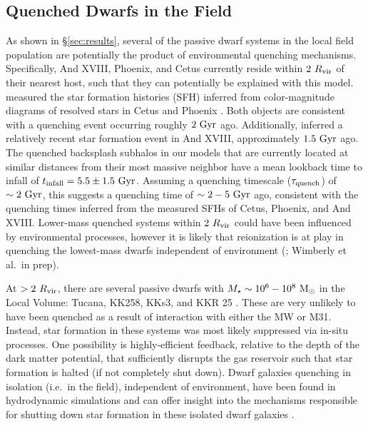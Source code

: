 \documentclass[usenatbib]{mnras}
\newcommand{\rvir}{R_{\rm vir}}
\newcommand{\mstar}{{M}_{\star}}
\newcommand{\msun}{{\rm M}_{\odot}}
\begin{document}
\subsection{Quenched Dwarfs in the Field}
\label{subsec:weirdos}


As shown in \S\ref{sec:results}, several of the passive dwarf systems in the
local field population are potentially the product of environmental quenching
mechanisms. 
Specifically, And XVIII, Phoenix, and Cetus currently reside within
$2~\rvir$ of their nearest host, such that they can potentially be
explained with this model. 
%
\citet{weisz14a} measured the star formation histories (SFH) inferred
from color-magnitude diagrams of resolved stars in Cetus and Phoenix
\citep[see also][]{hidalgo,monelli10a,monelli10b,monelli12}. 
Both objects are consistent with a quenching event occurring roughly
$2~{\rm Gyr}$ ago. 
Additionally, \citet{makarova17} inferred a relatively recent star
formation event in And XVIII, approximately $1.5~{\rm Gyr}$ ago.
%
The quenched backsplash subhalos in our models that are currently located at
similar distances from their most massive neighbor have a mean lookback time to
infall of $t_{\rm infall} = 5.5 \pm 1.5~{\rm Gyr}$. Assuming a quenching
timescale ($\tau_{\rm quench}$) of $\sim 2~{\rm Gyr}$, this suggests a quenching
time of $\sim 2-5~{\rm Gyr}$ ago, consistent with the quenching times inferred
from the measured SFHs of Cetus, Phoenix, and And XVIII.
%
Lower-mass quenched systems within $2~\rvir$ \citep[e.g.~Eri~II,][]{DES15,
  koposov15} could have been influenced by environmental processes, however it is
likely that reionization is at play in quenching the lowest-mass dwarfs
independent of environment (\citealt{brown14}; Wimberly et al.~in prep).





At $>2~\rvir$, there are several passive dwarfs with
$\mstar \sim 10^{6}-10^{8}~\msun$ in the Local Volume: Tucana, KK258, KKs3, and
KKR 25 \citep{lavery92, makarov12, weisz14a, karachentsev14b, karachentsev15b,
  karachentsev15a}. These are very unlikely to have been quenched as a result of
interaction with either the MW or M31. Instead, star formation in these systems
was most likely suppressed via in-situ processes. One possibility is
highly-efficient feedback, relative to the depth of the dark matter potential,
that sufficiently disrupts the gas reservoir such that star formation is halted
(if not completely shut down). 
%
 Dwarf galaxies quenching in isolation (i.e.~in the field),
 independent of environment, have been found in hydrodynamic
 simulations and can offer insight into the mechanisms responsible for
 shutting down star formation in these isolated dwarf galaxies
 \citep[e.g.][]{fitts17}.  
\end{document}
